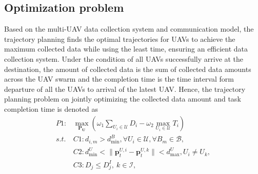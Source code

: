 \documentclass[journal]{IEEEtran}
\begin{document}
\subsection{Optimization problem}\label{optimization_prob}
Based on the multi-UAV data collection system and communication model, the trajectory planning finds the optimal trajectories for UAVs to achieve the maximum collected data while using the least time, ensuring an efficient data collection system. 
%
Under the condition of all UAVs successfully arrive at the destination, the amount of collected data is the sum of collected data amounts across the UAV swarm and the completion time is the time interval form departure of all the UAVs to arrival of the latest UAV. 
Hence, the trajectory planning problem on jointly optimizing the collected data amount and task completion time is denoted as 
\begin{align}
  P1:& \max\limits_{\mathbf{P_U}}\left({\omega_1 \sum_{U_i\in \mathcal{U}}{D_i}-\omega_2 \max_{U_i\in \mathcal{U}}T_i}\right)\label{optm_prob} \\
  s.t. \: & C1: d_{i,m} > d_{\min}^{B}, \forall U_i \in \mathcal{U}, \forall B_m \in \mathcal{B}, \nonumber \\
    & C2: d^{U}_{\min} < \lVert \mathbf{p}^{U,i}_t - \mathbf{p}^{U,k}_t \rVert < d^{U}_{\max} , U_i \neq U_k, \nonumber \\
  & C3: D_j\leq D^I_j,\: k\in\mathcal{I}, \nonumber
\end{align}
\end{document}
